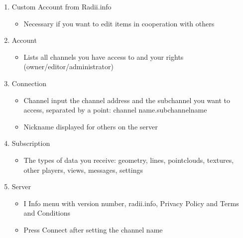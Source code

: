 \documentclass[letterpaper,10pt,english]{sphinxmanual}
\begin{document}
\noindent{}
\begin{enumerate}
%
\item {} 
\sphinxAtStartPar
Custom Account from Radii.info
\begin{itemize}
\item {} 
\sphinxAtStartPar
Necessary if you want to edit items in cooperation with others

\end{itemize}

\item {} 
\sphinxAtStartPar
Account
\begin{itemize}
\item {} 
\sphinxAtStartPar
Lists all channels you have access to and your rights (owner/editor/administrator)

\end{itemize}

\item {} 
\sphinxAtStartPar
Connection
\begin{itemize}
\item {} 
\sphinxAtStartPar
Channel \sphinxhyphen{} input the channel address and the subchannel you want to access, separated by a point: channel name.subchannelname

\item {} 
\sphinxAtStartPar
Nickname \sphinxhyphen{} displayed for others on the server

\end{itemize}

\item {} 
\sphinxAtStartPar
Subscription
\begin{itemize}
\item {} 
\sphinxAtStartPar
The types of data you receive: geometry, lines, point\sphinxhyphen{}clouds, textures, other players, views, messages, settings

\end{itemize}

\item {} 
\sphinxAtStartPar
Server
\begin{itemize}
\item {} 
\sphinxAtStartPar
I \sphinxhyphen{} Info menu with version number, radii.info, Privacy Policy and Terms and Conditions

\item {} 
\sphinxAtStartPar
Press Connect after setting the channel name


\end{itemize}
\end{enumerate}
\end{document}
